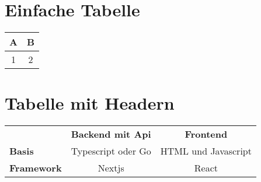 \section{Einfache Tabelle}
\begin{tabular}{|c|c|}
  \hline
  A & B \\
  \hline
  1 & 2 \\
\hline
\end{tabular}

\section{Tabelle mit Headern}
\begin{tabular}{|l|c|c|}
  \hline
  \rowcolor{gray!20} & \textbf{Backend mit Api} & \textbf{Frontend} \\
  \cellcolor{gray!20} \textbf{Basis} & \cellcolor{blue!20} Typescript oder Go & \cellcolor{orange!20}HTML und Javascript \\
  \cellcolor{gray!20} \textbf{Framework} & \cellcolor{blue!20} Nextjs & \cellcolor{orange!20} React \\
  \hline
\end{tabular}

